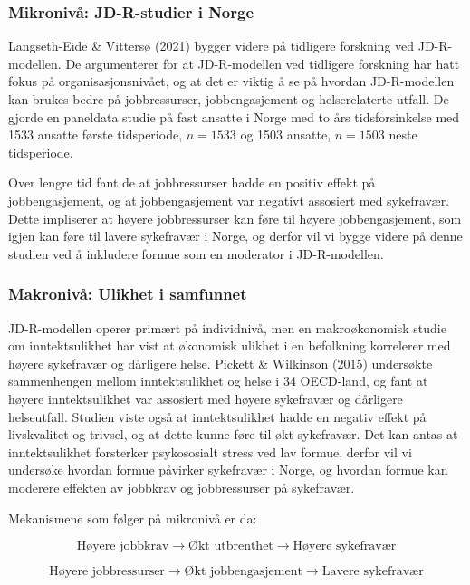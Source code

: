 \documentclass[
  12pt,
  a4paper,
  DIV=11,
  numbers=noendperiod]{scrartcl}
\begin{document}
\subsubsection{Mikronivå: JD-R-studier i
Norge}\label{mikronivuxe5-jd-r-studier-i-norge}

Langseth-Eide \& Vittersø (2021) bygger videre på tidligere forskning
ved JD-R-modellen. De argumenterer for at JD-R-modellen ved tidligere
forskning har hatt fokus på organisasjonsnivået, og at det er viktig å
se på hvordan JD-R-modellen kan brukes bedre på jobbressurser,
jobbengasjement og helserelaterte utfall. De gjorde en paneldata studie
på fast ansatte i Norge med to års tidsforsinkelse med 1533 ansatte
første tidsperiode, \(n =1533\) og 1503 ansatte, \(n = 1503\) neste
tidsperiode.

Over lengre tid fant de at jobbressurser hadde en positiv effekt på
jobbengasjement, og at jobbengasjement var negativt assosiert med
sykefravær. Dette impliserer at høyere jobbressurser kan føre til høyere
jobbengasjement, som igjen kan føre til lavere sykefravær i Norge, og
derfor vil vi bygge videre på denne studien ved å inkludere formue som
en moderator i JD-R-modellen.

\subsubsection{Makronivå: Ulikhet i
samfunnet}\label{makronivuxe5-ulikhet-i-samfunnet}

JD-R-modellen operer primært på individnivå, men en makroøkonomisk
studie om inntektsulikhet har vist at økonomisk ulikhet i en befolkning
korrelerer med høyere sykefravær og dårligere helse. Pickett \&
Wilkinson (2015) undersøkte sammenhengen mellom inntektsulikhet og helse
i 34 OECD-land, og fant at høyere inntektsulikhet var assosiert med
høyere sykefravær og dårligere helseutfall. Studien viste også at
inntektsulikhet hadde en negativ effekt på livskvalitet og trivsel, og
at dette kunne føre til økt sykefravær. Det kan antas at inntektsulikhet
forsterker psykososialt stress ved lav formue, derfor vil vi undersøke
hvordan formue påvirker sykefravær i Norge, og hvordan formue kan
moderere effekten av jobbkrav og jobbressurser på sykefravær.

Mekanismene som følger på mikronivå er da:

\[
\text{Høyere jobbkrav} \rightarrow \text{Økt utbrenthet} \rightarrow \text{Høyere sykefravær}
\]

\[
\text{Høyere jobbressurser} \rightarrow \text{Økt jobbengasjement} \rightarrow \text{Lavere sykefravær}
\]
\end{document}
